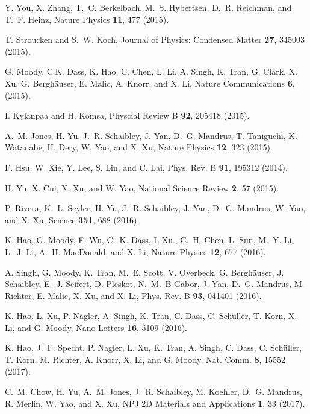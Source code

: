 \documentclass[aps,prb,superscriptaddress,letterpaper,amsmath,amssymb,twocolumn,preprintnumbers]{revtex4}
\begin{document}
\begin{thebibliography}{10}
Y. You, X. Zhang, T.~C. Berkelbach, M.~S. Hybertsen, D.~R. Reichman, and T.~F.
  Heinz, Nature Physics {\bf 11},  477  (2015).

T. Stroucken and S.~W. Koch, Journal of Physics: Condensed Matter {\bf 27},
  345003   (2015).

G. Moody, C.K. Dass, K. Hao, C. Chen, L. Li, A. Singh, K. Tran, G. Clark, X.
  Xu, G. Bergh{\"{a}}user, E. Malic, A. Knorr, and X. Li, Nature Communications
  {\bf 6},    (2015).

I. Kylanpaa and H. Komsa, Physcial Review B {\bf 92},  205418   (2015).

A.~M. Jones, H. Yu, J.~R. Schaibley, J. Yan, D.~G. Mandrus, T. Taniguchi, K.
  Watanabe, H. Dery, W. Yao, and X. Xu, Nature Physics {\bf 12},  323   (2015).

F. Hsu, W. Xie, Y. Lee, S. Lin, and C. Lai, Phys. Rev. B {\bf 91},  195312
  (2014).

H. Yu, X. Cui, X. Xu, and W. Yao, National Science Review {\bf 2},  57  (2015).

P. Rivera, K.~L. Seyler, H. Yu, J.~R. Schaibley, J. Yan, D.~G. Mandrus, W. Yao,
  and X. Xu, Science {\bf 351},  688  (2016).

K. Hao, G. Moody, F. Wu, C.~K. Dass, L Xu., C.~H. Chen, L. Sun, M.~Y. Li, L.~J.
  Li, A.~H. MacDonald, and X. Li, Nature Physics {\bf 12},  677  (2016).

A. Singh, G. Moody, K. Tran, M.~E. Scott, V. Overbeck, G. Bergh{\"{a}}user, J.
  Schaibley, E.~J. Seifert, D. Pleskot, N.~M.~B Gabor, J. Yan, D.~G. Mandrus,
  M. Richter, E. Malic, X. Xu, and X. Li, Phys. Rev. B {\bf 93},  041401
  (2016).

K. Hao, L. Xu, P. Nagler, A. Singh, K. Tran, C. Dass, C. Sch{\"{u}}ller, T.
  Korn, X. Li, and G. Moody, Nano Letters {\bf 16},  5109   (2016).

K. Hao, J.~F. Specht, P. Nagler, L. Xu, K. Tran, A. Singh, C. Dass, C.
  Sch{\"{u}}ller, T. Korn, M. Richter, A. Knorr, X. Li, and G. Moody, Nat.
  Comm. {\bf 8},  15552  (2017).

C.~M. Chow, H. Yu, A.~M. Jones, J.~R. Schaibley, M. Koehler, D.~G. Mandrus, R.
  Merlin, W. Yao, and X. Xu, NPJ 2D Materials and Applications {\bf 1},  33
  (2017).


\end{thebibliography}
\end{document}
